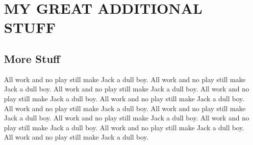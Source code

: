 \appendix
{}

\chapter{MY GREAT ADDITIONAL STUFF}

\section{More Stuff}

All work and no play still make Jack a dull boy.
All work and no play still make Jack a dull boy.
All work and no play still make Jack a dull boy.
All work and no play still make Jack a dull boy.
All work and no play still make Jack a dull boy.
All work and no play still make Jack a dull boy.
All work and no play still make Jack a dull boy.
All work and no play still make Jack a dull boy.
All work and no play still make Jack a dull boy.
All work and no play still make Jack a dull boy.
All work and no play still make Jack a dull boy.
